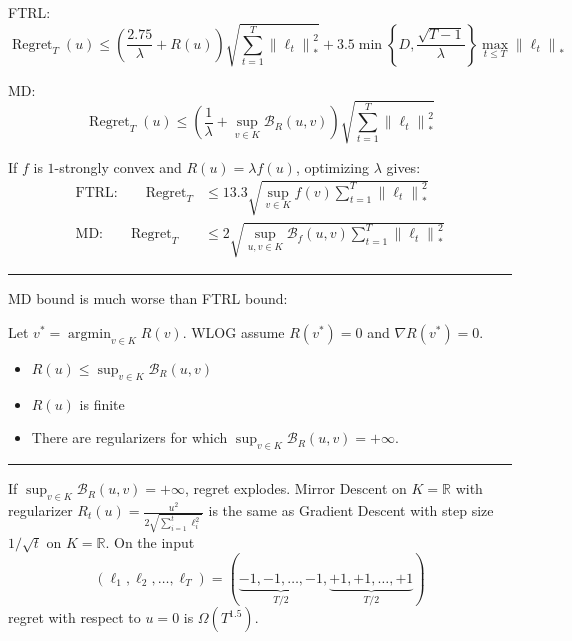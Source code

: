 \documentclass[largefonts,landscape]{sciposter}
\DeclareMathOperator{\Regret}{Regret}
\DeclareMathOperator*{\argmin}{argmin}
\newcommand{\R}{\mathbb{R}}
\newcommand{\norm}[1]{\left\|#1\right\|}
\newcommand{\grad}{\nabla}
\newcommand{\Breg}{\mathcal{B}}
\begin{document}
\begin{multicols}{3}
\begin{minipage}{1.0\linewidth}
FTRL:
$$
\Regret_T(u) \le \left(\frac{2.75}{\lambda} + R(u)\right) \sqrt{\sum_{t=1}^T \norm{\ell_t}_*^2} + 3.5 \min \left\{ D, \frac{\sqrt{T-1}}{\lambda} \right\} \max_{t \le T} \norm{\ell_t}_*
$$

MD:
$$
\Regret_T(u) \le \left(\frac{1}{\lambda} + \sup_{v \in K} \Breg_{R}(u,v) \right) \sqrt{\sum_{t=1}^T \norm{\ell_t}_*^2}
$$

If $f$ is $1$-strongly convex and $R(u) = \lambda f(u)$, optimizing $\lambda$ gives:
\begin{align*}
\text{FTRL:} \qquad \Regret_T & \le 13.3 \sqrt{ \sup_{v \in K} f(v) \sum_{t=1}^T \norm{\ell_t}_*^2} \\
\text{MD:} \qquad \Regret_T & \le 2 \sqrt{ \sup_{u,v \in K} \Breg_{f}(u,v) \sum_{t=1}^T \norm{\ell_t}_*^2}
\end{align*}
\end{minipage}

\vspace{0.6cm}

\hrule height 4pt

\vspace{0.6cm}


\begin{minipage}{1.0\linewidth}
MD bound is much worse than FTRL bound:

Let $v^* = \argmin_{v \in K} R(v)$.
WLOG assume $R(v^*) = 0$ and $\grad R(v^*) = 0$.

\begin{itemize}
\item $R(u) \le \sup_{v \in K} \Breg_{R}(u,v)$
\item $R(u)$ is finite
\item There are regularizers for which $\sup_{v \in K} \Breg_{R}(u,v) = + \infty$.
\end{itemize}
\end{minipage}

\vspace{0.6cm}

\hrule height 1pt

\vspace{0.6cm}

\begin{minipage}{1.0\linewidth}
If $\sup_{v \in K} \Breg_{R}(u,v) = +\infty$, regret explodes.
Mirror Descent on $K=\R$ with regularizer $R_t(u) = \frac{u^2}{2 \sqrt{\sum_{i=1}^t \ell_i^2}}$
is the same as Gradient Descent with step size $1/\sqrt{t}$ on $K=\R$.
On the input
$$
(\ell_1, \ell_2, \dots, \ell_T) = (\underbrace{-1, -1, \dots, -1}_{T/2}, \underbrace{+1, +1, \dots, +1}_{T/2})
$$
regret with respect to $u=0$ is $\Omega(T^{1.5})$.
\end{minipage}


\end{multicols}
\end{document}
